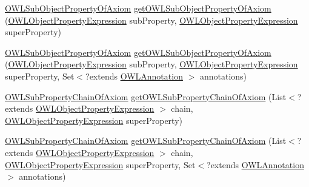 \begin{DoxyCompactItemize}
\item 
\hyperlink{interfaceorg_1_1semanticweb_1_1owlapi_1_1model_1_1_o_w_l_sub_object_property_of_axiom}{O\-W\-L\-Sub\-Object\-Property\-Of\-Axiom} \hyperlink{interfaceorg_1_1semanticweb_1_1owlapi_1_1model_1_1_o_w_l_data_factory_a04f7b1e2f755694b2b5fbcc81bc64463}{get\-O\-W\-L\-Sub\-Object\-Property\-Of\-Axiom} (\hyperlink{interfaceorg_1_1semanticweb_1_1owlapi_1_1model_1_1_o_w_l_object_property_expression}{O\-W\-L\-Object\-Property\-Expression} sub\-Property, \hyperlink{interfaceorg_1_1semanticweb_1_1owlapi_1_1model_1_1_o_w_l_object_property_expression}{O\-W\-L\-Object\-Property\-Expression} super\-Property)
\item 
\hyperlink{interfaceorg_1_1semanticweb_1_1owlapi_1_1model_1_1_o_w_l_sub_object_property_of_axiom}{O\-W\-L\-Sub\-Object\-Property\-Of\-Axiom} \hyperlink{interfaceorg_1_1semanticweb_1_1owlapi_1_1model_1_1_o_w_l_data_factory_a0d4e1537c1b20109c1e6717a321aaf0b}{get\-O\-W\-L\-Sub\-Object\-Property\-Of\-Axiom} (\hyperlink{interfaceorg_1_1semanticweb_1_1owlapi_1_1model_1_1_o_w_l_object_property_expression}{O\-W\-L\-Object\-Property\-Expression} sub\-Property, \hyperlink{interfaceorg_1_1semanticweb_1_1owlapi_1_1model_1_1_o_w_l_object_property_expression}{O\-W\-L\-Object\-Property\-Expression} super\-Property, Set$<$?extends \hyperlink{interfaceorg_1_1semanticweb_1_1owlapi_1_1model_1_1_o_w_l_annotation}{O\-W\-L\-Annotation} $>$ annotations)
\item 
\hyperlink{interfaceorg_1_1semanticweb_1_1owlapi_1_1model_1_1_o_w_l_sub_property_chain_of_axiom}{O\-W\-L\-Sub\-Property\-Chain\-Of\-Axiom} \hyperlink{interfaceorg_1_1semanticweb_1_1owlapi_1_1model_1_1_o_w_l_data_factory_ad29ece1060f41fc74573d7f7f0dd2d6f}{get\-O\-W\-L\-Sub\-Property\-Chain\-Of\-Axiom} (List$<$?extends \hyperlink{interfaceorg_1_1semanticweb_1_1owlapi_1_1model_1_1_o_w_l_object_property_expression}{O\-W\-L\-Object\-Property\-Expression} $>$ chain, \hyperlink{interfaceorg_1_1semanticweb_1_1owlapi_1_1model_1_1_o_w_l_object_property_expression}{O\-W\-L\-Object\-Property\-Expression} super\-Property)
\item 
\hyperlink{interfaceorg_1_1semanticweb_1_1owlapi_1_1model_1_1_o_w_l_sub_property_chain_of_axiom}{O\-W\-L\-Sub\-Property\-Chain\-Of\-Axiom} \hyperlink{interfaceorg_1_1semanticweb_1_1owlapi_1_1model_1_1_o_w_l_data_factory_a6886f1bb7a7379917beb935ee91887fb}{get\-O\-W\-L\-Sub\-Property\-Chain\-Of\-Axiom} (List$<$?extends \hyperlink{interfaceorg_1_1semanticweb_1_1owlapi_1_1model_1_1_o_w_l_object_property_expression}{O\-W\-L\-Object\-Property\-Expression} $>$ chain, \hyperlink{interfaceorg_1_1semanticweb_1_1owlapi_1_1model_1_1_o_w_l_object_property_expression}{O\-W\-L\-Object\-Property\-Expression} super\-Property, Set$<$?extends \hyperlink{interfaceorg_1_1semanticweb_1_1owlapi_1_1model_1_1_o_w_l_annotation}{O\-W\-L\-Annotation} $>$ annotations)

\end{DoxyCompactItemize}
